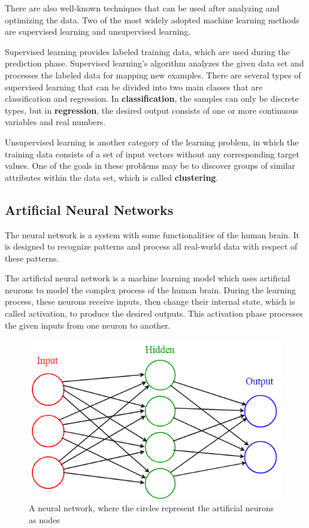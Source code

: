 There are also well-known techniques that can be used after analyzing and optimizing the data. Two of the most widely adopted machine learning methods are supervised learning and unsupervised learning.\smallskip

Supervised learning provides labeled training data, which are used during the prediction phase. Supervised learning's algorithm analyzes the given data set and processes the labeled data for mapping new examples. There are several types of supervised learning that can be divided into two main classes that are classification and regression. In \textbf{classification}, the samples can only be discrete types, but in \textbf{regression}, the desired output consists of one or more continuous variables and real numbers.

Unsupervised learning is another category of the learning problem, in which the training data consists of a set of input vectors without any corresponding target values. One of the goals in these problems may be to discover groups of similar attributes within the data set, which is called \textbf{clustering}.\medskip



\subsection{Artificial Neural Networks}

The neural network is a system with some functionalities of the human brain. It is designed to recognize patterns and process all real-world data with respect of these patterns. \medskip

The artificial neural network \cite{priddy2005artificial}\cite{anastassiou2011intelligent} is a machine learning model which uses artificial neurons to model the complex process of the human brain. During the learning process, these neurons receive inputs, then change their internal state, which is called activation, to produce the desired outputs. This activation phase processes the given inputs from one neuron to another.\medskip

\begin{figure}[h]
	\centering
	\includegraphics[height=0.35\linewidth]{./figures/feedforward}
	\caption{A neural network, where the circles represent the artificial neurons as nodes}
	\label{fig:feedforward}
\end{figure}

